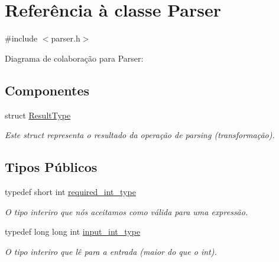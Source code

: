 \hypertarget{classParser}{}\section{Referência à classe Parser}
\label{classParser}


{\ttfamily \#include $<$parser.\+h$>$}



Diagrama de colaboração para Parser\+:
\subsection*{Componentes}
\begin{DoxyCompactItemize}
\item 
struct \hyperlink{structParser_1_1ResultType}{Result\+Type}
\begin{DoxyCompactList}\small\item\em Este struct representa o resultado da operação de parsing (transformação). \end{DoxyCompactList}\end{DoxyCompactItemize}
\subsection*{Tipos Públicos}
\begin{DoxyCompactItemize}
\item 
typedef short int \hyperlink{classParser_a6fda6745fb8e655fb2ee8e2d47dc2bed}{required\+\_\+int\+\_\+type}
\begin{DoxyCompactList}\small\item\em O tipo interiro que nós aceitamos como válida para uma expressão. \end{DoxyCompactList}\item 
typedef long long int \hyperlink{classParser_ae104286b7f2aa52593e92d601bf60c6f}{input\+\_\+int\+\_\+type}
\begin{DoxyCompactList}\small\item\em O tipo interiro que lê para a entrada (maior do que o int). \end{DoxyCompactList}\end{DoxyCompactItemize}
